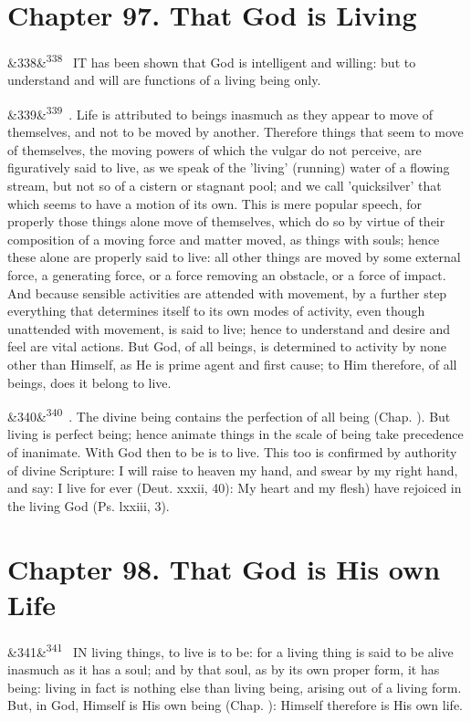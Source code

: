 \documentclass[12pt]{article}
\newcommand{\para}[1][]{\par\noindent\ifx&#1&\else\textsuperscript{\footnotesize #1}~\fi}
\begin{document}
\section*{Chapter 97. That God is Living}

\para[338] IT has been shown that God is intelligent and willing: but to understand and will are functions of a living being only.

\para[339] 2. Life is attributed to beings inasmuch as they appear to move of themselves, and not to be moved by another. Therefore things that seem to move of themselves, the moving powers of which the vulgar do not perceive, are figuratively said to live, as we speak of the 'living' (running) water of a flowing stream, but not so of a cistern or stagnant pool; and we call 'quicksilver' that which seems to have a motion of its own. This is mere popular speech, for properly those things alone move of themselves, which do so by virtue of their composition of a moving force and matter moved, as things with souls; hence these alone are properly said to live: all other things are moved by some external force, a generating force, or a force removing an obstacle, or a force of impact. And because sensible activities are attended with movement, by a further step everything that determines itself to its own modes of activity, even though unattended with movement, is said to live; hence to understand and desire and feel are vital actions. But God, of all beings, is determined to activity by none other than Himself, as He is prime agent and first cause; to Him therefore, of all beings, does it belong to live.

\para[340] 3. The divine being contains the perfection of all being (Chap. ). But living is perfect being; hence animate things in the scale of being take precedence of inanimate. With God then to be is to live. This too is confirmed by authority of divine Scripture: I will raise to heaven my hand, and swear by my right hand, and say: I live for ever (Deut. xxxii, 40): My heart and my flesh) have rejoiced in the living God (Ps. lxxiii, 3).

\section*{Chapter 98. That God is His own Life}

\para[341] IN living things, to live is to be: for a living thing is said to be alive inasmuch as it has a soul; and by that soul, as by its own proper form, it has being: living in fact is nothing else than living being, arising out of a living form. But, in God, Himself is His own being (Chap. ): Himself therefore is His own life.
\end{document}
